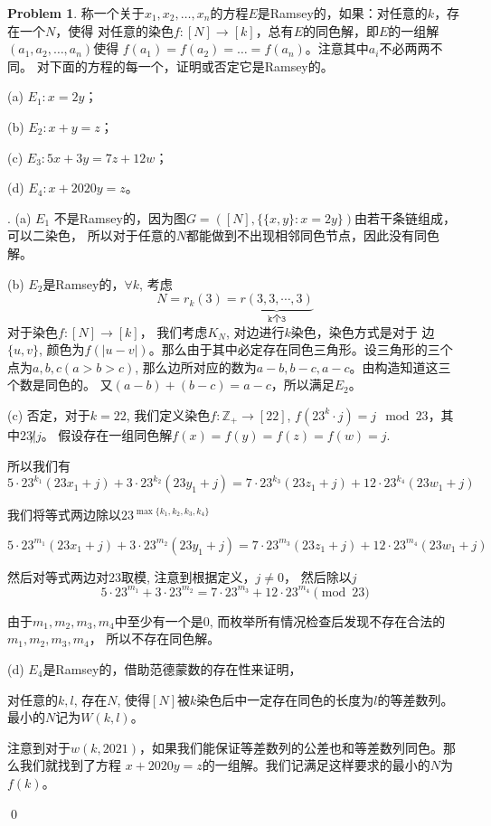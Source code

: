 \documentclass[UTF8]{ctexart}
\newenvironment{sol}
  {\par\vspace{3mm}\noindent{\it Solution}.}
  {\qed \\ \medskip}
\theoremstyle{definition}
\newtheorem{problem}{Problem}
\begin{document}
\begin{problem}
称一个关于$x_1, x_2, \dots, x_n$的方程$E$是Ramsey的，如果：对任意的$k$，存在一个$N$，使得
对任意的染色$f: [N] \to [k]$，总有$E$的同色解，即$E$的一组解$(a_1, a_2, \dots, a_n)$使得
$f(a_1) = f(a_2) = \dots = f(a_n)$。注意其中$a_i$不必两两不同。
对下面的方程的每一个，证明或否定它是Ramsey的。

(a) $E_1 : x = 2y$；

(b) $E_2 : x + y = z$；

(c) $E_3 : 5x + 3y = 7z + 12w$；

(d) $E_4 : x + 2020y = z$。

\begin{sol}
  (a) $E_1$ 不是Ramsey的，因为图$G=([N], \{\{x,y\}:x=2y\})$由若干条链组成，可以二染色，
  所以对于任意的$N$都能做到不出现相邻同色节点，因此没有同色解。

  (b) $E_2$是Ramsey的，$\forall k$, 考虑
  $$
  N = r_k(3) = \underbrace{r(3,3,\cdots,3)}_{\texttt{k个3}}
  $$
  对于染色$f:[N]\rightarrow[k]$， 我们考虑$K_N$, 对边进行$k$染色，染色方式是对于
  边$\{u,v\}$, 颜色为$f(|u-v|)$。那么由于其中必定存在同色三角形。设三角形的三个
  点为$a,b,c(a>b>c)$, 那么边所对应的数为$a-b,b-c,a-c$。由构造知道这三个数是同色的。
  又$(a-b)+(b-c)=a-c$，所以满足$E_2$。

  (c) 否定，对于$k=22$, 我们定义染色$f : \mathbb{Z}_+ \rightarrow [22]$, 
  $f(23^k\cdot j)=j \mod 23$，其中$23 \not| j$。
  假设存在一组同色解$f(x)=f(y)=f(z)=f(w)=j$.

  所以我们有
  $$
  5 \cdot 23^{k_1}(23x_1 + j) + 3 \cdot 23^{k_2}(23y_1 + j) = 
  7 \cdot 23^{k_3}(23z_1 + j) + 12 \cdot 23^{k_4}(23w_1 + j)
  $$

  我们将等式两边除以$23^{\max\{k_1,k_2,k_3,k_4\}}$

  $$
  5 \cdot 23^{m_1}(23x_1 + j) + 3 \cdot 23^{m_2}(23y_1 + j) = 
  7 \cdot 23^{m_3}(23z_1 + j) + 12 \cdot 23^{m_4}(23w_1 + j)
  $$

  然后对等式两边对$23$取模, 注意到根据定义，$j \not= 0$， 然后除以$j$
  $$
  5 \cdot 23^{m_1} + 3 \cdot 23^{m_2} = 
  7 \cdot 23^{m_3} + 12 \cdot 23^{m_4} \pmod {23}
  $$

  由于$m_1,m_2,m_3,m_4$中至少有一个是$0$, 而枚举所有情况检查后发现不存在合法的
  $m_1,m_2,m_3,m_4$， 所以不存在同色解。
  
  (d) $E_4$是Ramsey的，借助范德蒙数的存在性来证明，
  \begin{lemma}
    对任意的$k, l$, 存在$N$, 使得$[N]$被$k$染色后中一定存在同色的长度为$l$的等差数列。
    最小的$N$记为$W(k,l)$。
  \end{lemma}
  注意到对于$w(k,2021)$，如果我们能保证等差数列的公差也和等差数列同色。那么我们就找到了方程
  $x+2020y=z$的一组解。我们记满足这样要求的最小的$N$为$f(k)$。


\end{sol}
\end{problem}
\end{document}
